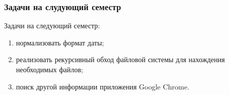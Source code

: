\subsubsection{Задачи на слудующий семестр}
Задачи на следующий семестр:
\begin{enumerate}
  \item нормализовать формат даты;
  \item реализовать рекурсивный обход файловой системы для нахождения необходимых файлов;
  \item поиск другой информации приложения Google Chrome.
\end{enumerate}

\clearpage
